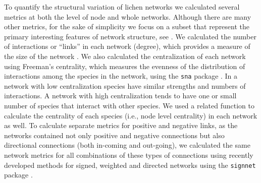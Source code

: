 \documentclass[fleqn,12pt]{olplainarticle}
\begin{document}
To quantify the structural variation of lichen networks we calculated
several metrics at both the level of node and whole networks. Although
there are many other metrics, for the sake of simplicity we focus on a
subset that represent the primary interesting features of network
structure, see \cite{Lau2017a}. We calculated the number of
interactions or ``links'' in each network (degree), which provides a
measure of the size of the network \citep{Lau2016afix,
  Borrett2014EnaR:Analysis}. We also calculated the centralization of
each network using Freeman's centrality, which measures the evenness
of the distribution of interactions among the species in the network,
using the \texttt{sna} package \citep{sna}. In a network with low
centralization species have similar strengths and numbers of
interactions. A network with high centralization tends to have one or
small number of species that interact with other species. We used a
related function to calculate the centrality of each species (i.e.,
node level centrality) in each network as well. To calculate separate
metrics for positive and negative links, as the networks contained not
only positive and negative connections but also directional
connections (both in-coming and out-going), we calculated the same
network metrics for all combinations of these types of connections
using recently developed methods for signed, weighted and directed
networks \citep{Everett2014NetworksTies} using the \texttt{signnet}
package \citep{signnet}.
\end{document}
